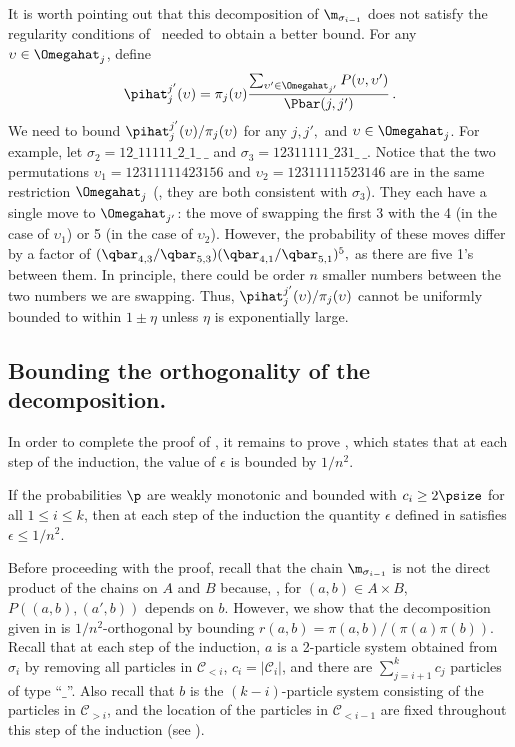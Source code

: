 \begin{remark}\label{rem:eta}

It is worth pointing out that this decomposition of $\m_{\sigma_{i-1}}$ 
does not satisfy the 
regularity conditions of~\cite{jstv04} needed to obtain a better bound.  
For any $\upsilon\in \Omegahat_j$, define 
\[\pihat_j^{j'}(\upsilon)=\pi_j(\upsilon)\frac{\sum_{\upsilon'\in\Omegahat_{j'}}P(\upsilon,\upsilon')}{\Pbar(j,j')}\,.\] 
We need to bound $\pihat_j^{j'}(\upsilon)/\pi_j(\upsilon)$ for any 
$j,j',$ and $\upsilon\in\Omegahat_j$.   For example, let $\sigma_{2} = 
12\_11111\_2\_1\_~\_$ and $\sigma_3 = 12311111\_231\_~\_$. Notice that 
the two permutations $\upsilon_1=12311111423156$ and 
$\upsilon_2=12311111523146$ are in the same restriction $\Omegahat_j$ 
(\ie,  they are both consistent with $\sigma_3$).  They each have a 
single move to $\Omegahat_{j'}$: the move of swapping the first 3 with 
the 4 (in the case of $\upsilon_1$) or 5 (in the case of $\upsilon_2$).  
However, the probability of these moves differ by a factor of 
$(\qbar_{4,3}/\qbar_{5,3})(\qbar_{4,1}/\qbar_{5,1})^5,$ as there are five 1's between 
them.  In principle, there could be order $n$ smaller numbers between 
the two numbers we are swapping.  Thus, 
$\pihat_j^{j'}(\upsilon)/\pi_j(\upsilon)$ cannot be uniformly bounded 
to within $1\pm \eta$ unless $\eta$ is exponentially large. 

\end{remark}

%
%
\subsection{Bounding the orthogonality of the decomposition.}\label{sec:ortho}  %

In order to complete the proof of , it remains to prove
, which states that %
%
at each step of the induction,
the value of $\epsilon$ is bounded by $1/n^2$. %

\begin{lemma}\label{lem:perms}
If the probabilities $\p$ are weakly monotonic and bounded with 
$c_i\geq 2\psize$ for all $1\leq i \leq k$, then at each step of 
the induction %
the quantity $\epsilon$ defined in  
satisfies $\epsilon\leq 1/n^2$. %
\end{lemma}

Before proceeding with the proof, 
recall that the chain $\m_{\sigma_{i-1}}$ is not the direct product of 
the chains on $A$ and $B$ because, \eg, for $(a,b) \in A\times B$, 
$P((a,b),(a',b))$ depends on $b$. However, we show that the 
decomposition given in  is $1/n^2$-orthogonal by 
bounding $r(a,b) = \pi(a,b)/(\pi(a)\pi(b))$.  Recall that at each step 
of the induction, $a$ is a 2-particle system obtained from $\sigma_i$ 
by removing all particles in $\mathcal{C}_{< i}$, $c_i = 
|\mathcal{C}_i|$, and there are $\sum^{k}_{j=i+1}c_j$ particles of type 
``$\_$''.  Also recall that $b$ is the $(k-i)$-particle system 
consisting of the particles in $\mathcal{C}_{>i}$, and the location of 
the particles in $\mathcal{C}_{< i-1}$ are fixed throughout this step 
of the induction (see ).  

